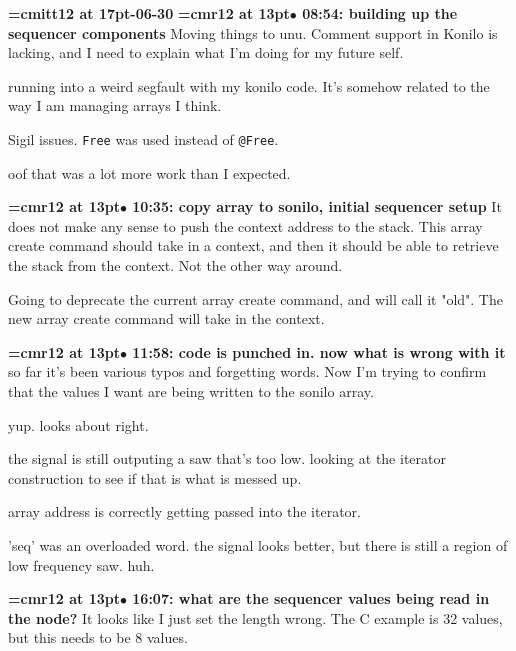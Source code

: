 {\medskip\noindent\bf\font\titlefont=cmitt12 at 17pt-06-30}\medskip
{\smallskip\noindent\bf\font\titlefont=cmr12 at 13pt\titlefont $\bullet$ 08:54: building up the sequencer components}\smallskip
Moving things to unu. Comment support in Konilo is lacking, and I need to explain what I'm doing for my future self.
\par

running into a weird segfault with my konilo code. It's somehow related to the way I am managing arrays I think.
\par

Sigil issues. {\tt Free} was used instead of {\tt @Free}.
\par

oof that was a lot more work than I expected.
\par

{\smallskip\noindent\bf\font\titlefont=cmr12 at 13pt\titlefont $\bullet$ 10:35: copy array to sonilo, initial sequencer setup}\smallskip
It does not make any sense to push the context address to the stack. This array create command should take in a context, and then it should be able to retrieve the stack from the context. Not the other way around.
\par

Going to deprecate the current array create command, and will call it "old". The new array create command will take in the context.
\par

{\smallskip\noindent\bf\font\titlefont=cmr12 at 13pt\titlefont $\bullet$ 11:58: code is punched in. now what is wrong with it}\smallskip
so far it's been various typos and forgetting words. Now I'm trying to confirm that the values I want are being written to the sonilo array.
\par

yup. looks about right.
\par

the signal is still outputing a saw that's too low. looking at the iterator construction to see if that is what is messed up.
\par

array address is correctly getting passed into the iterator.
\par

'seq' was an overloaded word. the signal looks better, but there is still a region of low frequency saw. huh.
\par

{\smallskip\noindent\bf\font\titlefont=cmr12 at 13pt\titlefont $\bullet$ 16:07: what are the sequencer values being read in the node?}\smallskip
It looks like I just set the length wrong. The C example is 32 values, but this needs to be 8 values.
\par

